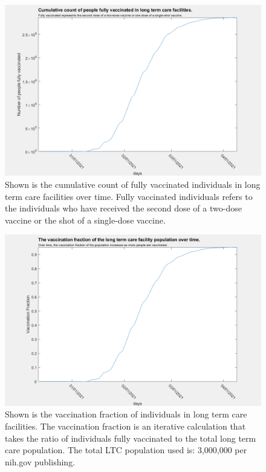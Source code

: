 \documentclass[twoside]{article}
\begin{document}
\begin{multicols}{2}
\begin{figure}[H]
	\includegraphics[width=\linewidth]{images/ltc_vac_cumulative.png}
	\caption{Shown is the cumulative count of fully vaccinated individuals in long term care facilities over time. Fully vaccinated individuals refers to the individuals who have received the second dose of a two-dose vaccine or the shot of a single-dose vaccine.}
	\label{fig:images/ltc_vac_cumulativeLabel}
\end{figure}

\begin{figure}[H]
	\includegraphics[width=\linewidth]{images/vac_fraction_LTC.png}
	\caption{Shown is the vaccination fraction of individuals in long term care facilities. The vaccination fraction is an iterative calculation that takes the ratio of individuals fully vaccinated to the total long term care population. The total LTC population used is: 3,000,000 per nih.gov publishing.  }
	\label{fig:images/vac_fraction_LTCLabel}
\end{figure}


\end{multicols}
\end{document}
